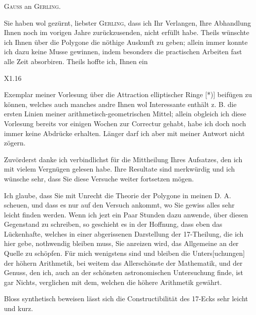 \begin{center}\large\textsc{Gauss} an \textsc{Gerling}.\end{center}
\noindent\hspace*{\parindent}Sie haben wol gezürnt, liebster \textsc{Gerling}, dass ich Ihr Verlangen,
Ihre Abhandlung Ihnen noch im vorigen Jahre zurückzusenden, nicht erfüllt habe.
Theils wünschte ich Ihnen über die Polygone die nöthige Auskunft zu geben; allein immer
konnte ich dazu keine Musse gewinnen, indem besonders die practischen Arbeiten fast alle
Zeit absorbiren. Theils hoffte ich, Ihnen ein
\par\vfill\noindent X1.\hfill16\par
\clearpage
{}
\noindent Exemplar meiner Vorlesung über die Attraction elliptischer Ringe [*)] beifügen
zu können, welches auch manches andre Ihnen wol Interessante enthält z. B. die ersten Linien
meiner arithmetisch-geometrischen Mittel; allein obgleich ich diese Vorlesung bereits vor
einigen Wochen zur Correctur gehabt, habe ich doch noch immer keine Abdrücke erhalten.
Länger darf ich aber mit meiner Antwort nicht zögern.

Zuvörderst danke ich verbindlichst für die Mittheilung Ihres Aufsatzes, den ich mit vielem
Vergnügen gelesen habe. Ihre Resultate sind merkwürdig und ich wünsche sehr, dass Sie diese
Versuche weiter fortsetzen mögen.

Ich glaube, dass Sie mit Unrecht die Theorie der Polygone in meinen D. A. scheuen,
und dass es nur auf den Versuch ankommt, wo Sie gewiss alles sehr leicht finden werden.
Wenn ich jezt ein Paar Stunden dazu anwende, über diesen Gegenstand zu schreiben,
so geschieht es in der Hoffnung, dass eben das Lückenhafte, welches in einer abgerissenen
Darstellung der 17-Theilung, die ich hier gebe, nothwendig bleiben muss, Sie anreizen wird,
das Allgemeine an der Quelle zu schöpfen. Für mich wenigstens sind und bleiben die
Unters[uchungen] der höhern Arithmetik, bei weitem das Allerschönste der Mathematik,
und der Genuss, den ich, auch an der schönsten astronomischen Untersuchung finde,
ist gar Nichts, verglichen mit dem, welchen die höhere Arithmetik gewährt.

Bloss synthetisch beweisen lässt sich die Constructibilität des 17-Ecks sehr leicht und kurz.

